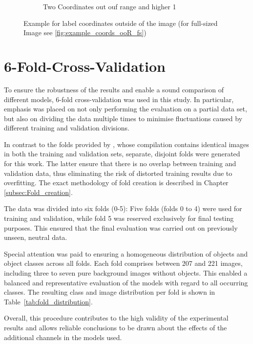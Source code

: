 \begin{figure}[h]
\begin{subfigure}[b]{0.45\textwidth}
        \caption{Two Coordinates out ouf range and higher 1}
        \label{fig:higher1}
    \end{subfigure}
    \caption[Example for label coordinates outside of the image]{Example for label coordinates outside of the image (for full-sized Image see \ref{fig:example_coords_ooR_fs})}
    \label{fig:example_coords_ooR}
\end{figure}







\section{6-Fold-Cross-Validation}
\label{sec_5Fold_CV}


To ensure the robustness of the results and enable a sound comparison of different models, 6-fold cross-validation was used in this study. In particular, emphasis was placed on not only performing the evaluation on a partial data set, but also on dividing the data multiple times to minimise fluctuations caused by different training and validation divisions.

In contrast to the folds provided by \citeauthor{Razakarivony2015} \cite{Razakarivony2015}, whose compilation contains identical images in both the training and validation sets, separate, disjoint folds were generated for this work. The latter ensure that there is no overlap between training and validation data, thus eliminating the risk of distorted training results due to overfitting. The exact methodology of fold creation is described in Chapter \ref{subsec:Fold_creation}.

The data was divided into six folds (0-5): Five folds (folds 0 to 4) were used for training and validation, while fold 5 was reserved exclusively for final testing purposes. This ensured that the final evaluation was carried out on previously unseen, neutral data.

Special attention was paid to ensuring a homogeneous distribution of objects and object classes across all folds. Each fold comprises between 207 and 221 images, including three to seven pure background images without objects. This enabled a balanced and representative evaluation of the models with regard to all occurring classes. The resulting class and image distribution per fold is shown in Table~\ref{tab:fold_distribution}.

Overall, this procedure contributes to the high validity of the experimental results and allows reliable conclusions to be drawn about the effects of the additional channels in the models used.


